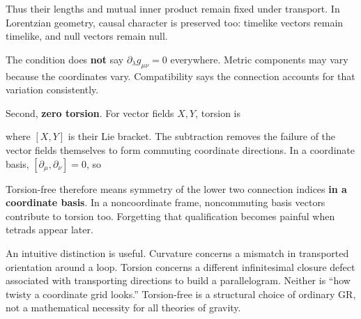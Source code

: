 \documentclass[
  11pt,
  letterpaper,
  oneside,
  openany]{scrbook}
\begin{document}
\begin{center}
\begingroup
{}
\ifdim\wd\grmathbox>\linewidth
\resizebox{\linewidth}{!}{\usebox{\grmathbox}}
\else\usebox{\grmathbox}\fi
\endgroup
\end{center}

Thus their lengths and mutual inner product remain fixed under
transport. In Lorentzian geometry, causal character is preserved too:
timelike vectors remain timelike, and null vectors remain null.

The condition does \textbf{not} say \(\partial_\lambda g_{\mu\nu}=0\)
everywhere. Metric components may vary because the coordinates vary.
Compatibility says the connection accounts for that variation
consistently.

Second, \textbf{zero torsion}. For vector fields \(X,Y\), torsion is

\begin{center}
\begingroup
{}
\ifdim\wd\grmathbox>\linewidth
\resizebox{\linewidth}{!}{\usebox{\grmathbox}}
\else\usebox{\grmathbox}\fi
\endgroup
\end{center}

where \([X,Y]\) is their Lie bracket. The subtraction removes the
failure of the vector fields themselves to form commuting coordinate
directions. In a coordinate basis, \([\partial_\mu,\partial_\nu]=0\), so

\begin{center}
\begingroup
{}
\ifdim\wd\grmathbox>\linewidth
\resizebox{\linewidth}{!}{\usebox{\grmathbox}}
\else\usebox{\grmathbox}\fi
\endgroup
\end{center}

Torsion-free therefore means symmetry of the lower two connection
indices \textbf{in a coordinate basis}. In a noncoordinate frame,
noncommuting basis vectors contribute to torsion too. Forgetting that
qualification becomes painful when tetrads appear later.

An intuitive distinction is useful. Curvature concerns a mismatch in
transported orientation around a loop. Torsion concerns a different
infinitesimal closure defect associated with transporting directions to
build a parallelogram. Neither is ``how twisty a coordinate grid
looks.'' Torsion-free is a structural choice of ordinary GR, not a
mathematical necessity for all theories of gravity.
\end{document}
